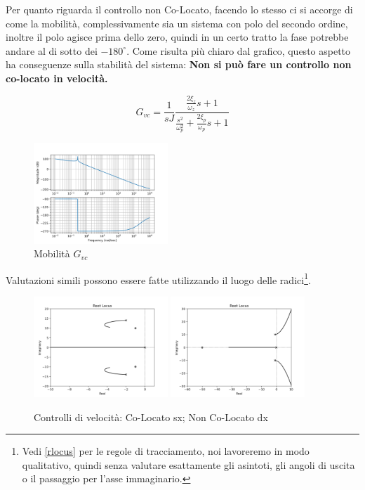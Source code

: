Per quanto riguarda il controllo non Co-Locato, facendo lo stesso ci si accorge di come la mobilità, complessivamente sia un sistema con polo del secondo ordine, inoltre il polo agisce prima dello zero, quindi in un certo tratto la fase potrebbe andare al di sotto dei \(-180^\circ\). Come risulta più chiaro dal grafico, questo aspetto ha conseguenze sulla stabilità del sistema: \textbf{Non si può fare un controllo non co-locato in velocità.}

\[G_{vc} = \frac{1}{sJ}\frac{\frac{2\xi_z}{\omega_z}s + 1}{\frac{s^2}{\omega^2_p} + \frac{2\xi_p}{\omega_p}s + 1}\]

\begin{figure}[h]
    \centering
    \includegraphics[width=0.45\textwidth]{Immagini/mobilita_gvc.png}
    \caption{Mobilità \(G_{vc}\)}
\end{figure}

Valutazioni simili possono essere fatte utilizzando il luogo delle radici\footnote{Vedi \ref{rlocus} per le regole di tracciamento, noi lavoreremo in modo qualitativo, quindi senza valutare esattamente gli asintoti, gli angoli di uscita o il passaggio per l'asse immaginario.}.

\begin{figure}[h]
    \centering
    \includegraphics[width=0.45\textwidth]{Immagini/controllo_v_colocato.png}
    \includegraphics[width=0.45\textwidth]{Immagini/controllo_v_non_colocato.png}
    \caption{Controlli di velocità: Co-Locato sx; Non Co-Locato dx}
\end{figure}

